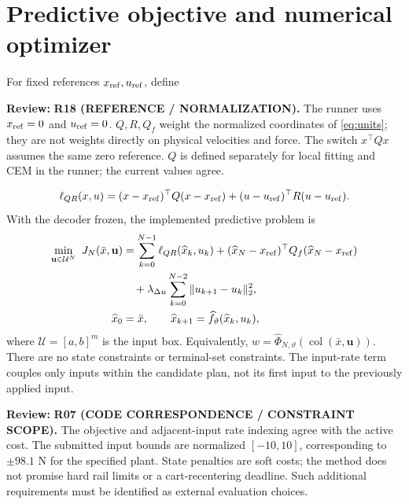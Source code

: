\documentclass[11pt]{article}
\newcommand{\col}{\operatorname{col}}
\newcommand{\review}[1]{\par\noindent\textcolor{red!70!black}{\textbf{Review:} #1}\par}
\begin{document}
\section{Predictive objective and numerical optimizer}
For fixed references $x_{\rm ref},u_{\rm ref}$, define
\review{\textbf{R18 (REFERENCE / NORMALIZATION).} The runner uses $x_{\rm ref}=0$ and $u_{\rm ref}=0$. $Q,R,Q_f$ weight the normalized coordinates of \eqref{eq:units}; they are not weights directly on physical velocities and force. The switch $x^\top Qx$ assumes the same zero reference. $Q$ is defined separately for local fitting and CEM in the runner; the current values agree.}

\begin{equation}\label{eq:stage}
\ell_{QR}(x,u)=(x-x_{\rm ref})^\top Q(x-x_{\rm ref})+(u-u_{\rm ref})^\top R(u-u_{\rm ref}).
\end{equation}
With the decoder frozen, the implemented predictive problem is
\begin{equation}\label{eq:mpc}
\begin{aligned}
\min_{\mathbf u\in\mathcal U^N}\ J_N(\bar x,\mathbf u)
&=\sum_{k=0}^{N-1}\ell_{QR}(\widehat x_k,u_k)
 +(\widehat x_N-x_{\rm ref})^\top Q_f(\widehat x_N-x_{\rm ref})\\
&\quad+\lambda_{\Delta u}\sum_{k=0}^{N-2}\|u_{k+1}-u_k\|_2^2,\\
\widehat x_0&=\bar x,\qquad \widehat x_{k+1}=\widehat f_\vartheta(\widehat x_k,u_k),
\end{aligned}
\end{equation}
where $\mathcal U=[a,b]^m$ is the input box. Equivalently, $w=\widehat\Phi_{N,\vartheta}(\col(\bar x,\mathbf u))$. There are no state constraints or terminal-set constraints. The input-rate term couples only inputs within the candidate plan, not its first input to the previously applied input.
\review{\textbf{R07 (CODE CORRESPONDENCE / CONSTRAINT SCOPE).} The objective and adjacent-input rate indexing agree with the active cost. The submitted input bounds are normalized $[-10,10]$, corresponding to $\pm98.1$ N for the specified plant. State penalties are soft costs; the method does not promise hard rail limits or a cart-recentering deadline. Such additional requirements must be identified as external evaluation choices.}
\end{document}
